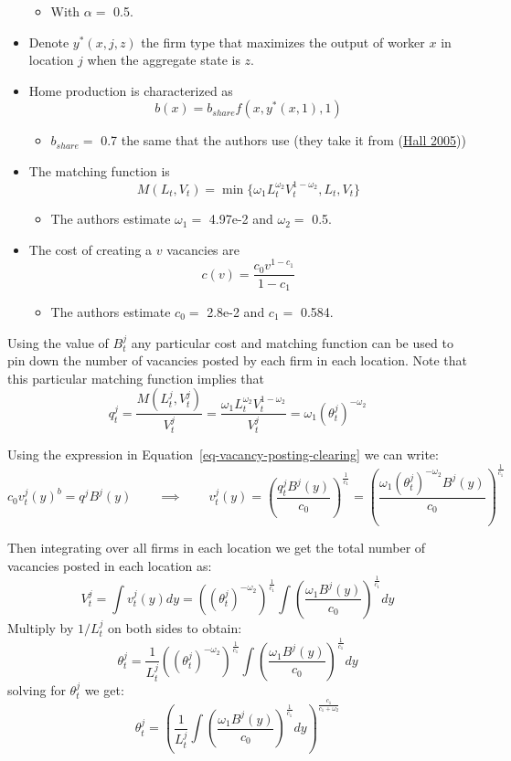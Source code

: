 \documentclass[
  letterpaper,
  DIV=11,
  numbers=noendperiod]{scrreprt}
\providecommand{\tightlist}{%
  \setlength{\itemsep}{0pt}\setlength{\parskip}{0pt}}\usepackage{longtable,booktabs,array}
\begin{document}
\begin{itemize}
  \begin{itemize}
  \tightlist
  \item
    With \(\alpha=\) 0.5.
  \end{itemize}
\item
  Denote \(y^*(x,j,z)\) the firm type that maximizes the output of
  worker \(x\) in location \(j\) when the aggregate state is \(z\).
\item
  Home production is characterized as
  \[b(x) = b_{share} f(x,y^*(x,1),1)\]

  \begin{itemize}
  \tightlist
  \item
    \(b_{share} =\) 0.7 the same that the authors use (they take it from
    (\protect\hyperlink{ref-hallEmploymentFluctuationsEquilibrium2005}{Hall
    2005}))
  \end{itemize}
\item
  The matching function is
  \[M(L_t, V_t) = \min\{\omega_1 L_t^{\omega_2}V_t^{1-\omega_2}, L_t, V_t\}\]

  \begin{itemize}
  \tightlist
  \item
    The authors estimate \(\omega_1 =\) 4.97e-2 and \(\omega_2=\) 0.5.
  \end{itemize}
\item
  The cost of creating a \(v\) vacancies are
  \[c(v) = \frac{c_0 v^{1-c_1}}{1 - c_1}\]

  \begin{itemize}
  \tightlist
  \item
    The authors estimate \(c_0 =\) 2.8e-2 and \(c_1=\) 0.584.
  \end{itemize}
\end{itemize}

Using the value of \(B^j_t\) any particular cost and matching function
can be used to pin down the number of vacancies posted by each firm in
each location. Note that this particular matching function implies that
\[q^j_t = \frac{M(L^j_t, V^j_t)}{V^j_t}=\frac{\omega_1 L_t^{\omega_2} V_t^{1 - \omega_2}}{V^j_t}= \omega_1(\theta_t^j)^{-\omega_2}\]

Using the expression in Equation~\ref{eq-vacancy-posting-clearing} we
can write:
\[c_0 v^{j}_t(y)^{b} = q^j B^j(y) \qquad \implies \qquad  v^{j}_t(y) = \left(\frac{q_t^j B^j(y)}{c_0}\right)^{\frac{1}{c_1}} = \left(\frac{\omega_1(\theta_t^j)^{-\omega_2} B^j(y)}{c_0}\right)^{\frac{1}{c_1}} \]

Then integrating over all firms in each location we get the total number
of vacancies posted in each location as:
\[V_t^j = \int v^j_t(y)dy = \left((\theta_t^j)^{-\omega_2}\right)^{\frac{1}{c_1}}\int\left(\frac{\omega_1 B^j(y)}{c_0}\right)^{\frac{1}{c_1}}dy\]
Multiply by \(1/L^j_t\) on both sides to obtain:
\[\theta^j_t = \frac{1}{L^j_t}\left((\theta_t^j)^{-\omega_2}\right)^{\frac{1}{c_1}}\int\left(\frac{\omega_1 B^j(y)}{c_0}\right)^{\frac{1}{c_1}}dy\]
solving for \(\theta^j_t\) we get:
\[\theta^j_t = \left(\frac{1}{L^j_t}\int\left(\frac{\omega_1 B^j(y)}{c_0}\right)^{\frac{1}{c_1}}dy\right)^{\frac{c_1}{c_1+\omega_2}}\]
\end{document}
